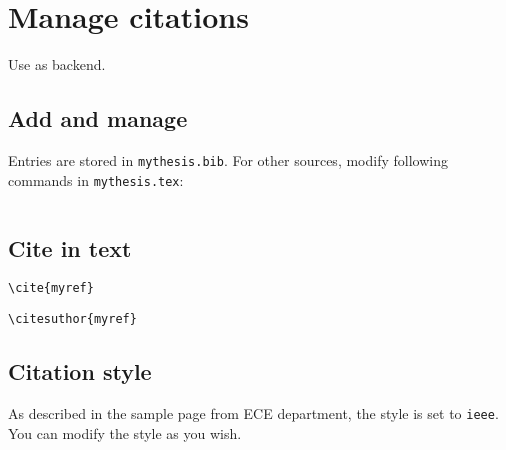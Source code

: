 \chapter{Manage citations}
\label{chap:bibliography}

Use  as  backend.

\section{Add and manage}

Entries are stored in \lstinline|mythesis.bib|. For other sources, modify following commands in \lstinline|mythesis.tex|:
\begin{lstlisting}[language=TeX]

\end{lstlisting}

\section{Cite in text}

\lstinline|\cite{myref}|

\lstinline|\citesuthor{myref}|

\section{Citation style}

As described in the sample page from ECE department, the style is set to \verb|ieee|. You can modify the style as you wish.
